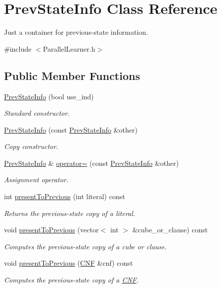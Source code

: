 \hypertarget{classPrevStateInfo}{\section{Prev\-State\-Info Class Reference}
\label{classPrevStateInfo}
}


Just a container for previous-\/state information.  




{\ttfamily \#include $<$Parallel\-Learner.\-h$>$}

\subsection*{Public Member Functions}
\begin{DoxyCompactItemize}
\item 
\hyperlink{classPrevStateInfo_a50137c40c6da236bb072857311d12e45}{Prev\-State\-Info} (bool use\-\_\-ind)
\begin{DoxyCompactList}\small\item\em Standard constructor. \end{DoxyCompactList}\item 
\hyperlink{classPrevStateInfo_a61bea1f6ca20ed686b3128792bc909b8}{Prev\-State\-Info} (const \hyperlink{classPrevStateInfo}{Prev\-State\-Info} \&other)
\begin{DoxyCompactList}\small\item\em Copy constructor. \end{DoxyCompactList}\item 
\hyperlink{classPrevStateInfo}{Prev\-State\-Info} \& \hyperlink{classPrevStateInfo_a8b4c55c373cd749ee7d1273a5e69cc67}{operator=} (const \hyperlink{classPrevStateInfo}{Prev\-State\-Info} \&other)
\begin{DoxyCompactList}\small\item\em Assignment operator. \end{DoxyCompactList}\item 
int \hyperlink{classPrevStateInfo_a3992998d924f45a6d7bebfc94cc72e4e}{present\-To\-Previous} (int literal) const 
\begin{DoxyCompactList}\small\item\em Returns the previous-\/state copy of a literal. \end{DoxyCompactList}\item 
void \hyperlink{classPrevStateInfo_a937a49373cd9a6ceeb04afb6ad821c34}{present\-To\-Previous} (vector$<$ int $>$ \&cube\-\_\-or\-\_\-clause) const 
\begin{DoxyCompactList}\small\item\em Computes the previous-\/state copy of a cube or clause. \end{DoxyCompactList}\item 
void \hyperlink{classPrevStateInfo_aac4253e0605a8afd293e327a45c7b6fe}{present\-To\-Previous} (\hyperlink{classCNF}{C\-N\-F} \&cnf) const 
\begin{DoxyCompactList}\small\item\em Computes the previous-\/state copy of a \hyperlink{classCNF}{C\-N\-F}. \end{DoxyCompactList}\end{DoxyCompactItemize}
